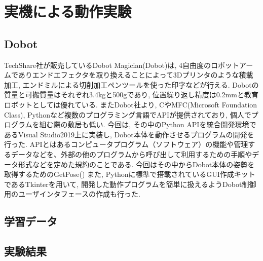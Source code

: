 \documentclass{suribt}
\begin{document}
\chapter{実機による動作実験}

\section{Dobot}
TechShare社が販売しているDobot Magician(Dobot)は, 4自由度のロボットアームでありエンドエフェクタを取り換えることによって3Dプリンタのような積載加工, エンドミルによる切削加工ペンツールを使った印字などが行える. 
Dobotの質量と可搬質量はそれぞれ3.4kgと500gであり, 位置繰り返し精度は0.2mmと教育ロボットとしては優れている. 
またDobot社より, CやMFC(Microsoft Foundation Class), Pythonなど複数のプログラミング言語でAPIが提供されており, 個人でプログラムを組む際の敷居も低い. 
今回は, その中のPython APIを統合開発環境であるVisual Studio2019上に実装し, Dobot本体を動作させるプログラムの開発を行った. APIとはあるコンピュータプログラム（ソフトウェア）の機能や管理するデータなどを、外部の他のプログラムから呼び出して利用するための手順やデータ形式などを定めた規約のことである. 
今回はその中からDobot本体の姿勢を取得するためのGetPose()
また, Pythonに標準で搭載されているGUI作成キットであるTkinterを用いて, 開発した動作プログラムを簡単に扱えるようDobot制御用のユーザインタフェースの作成も行った. 

\section{学習データ}

\section{実験結果}
\end{document}
